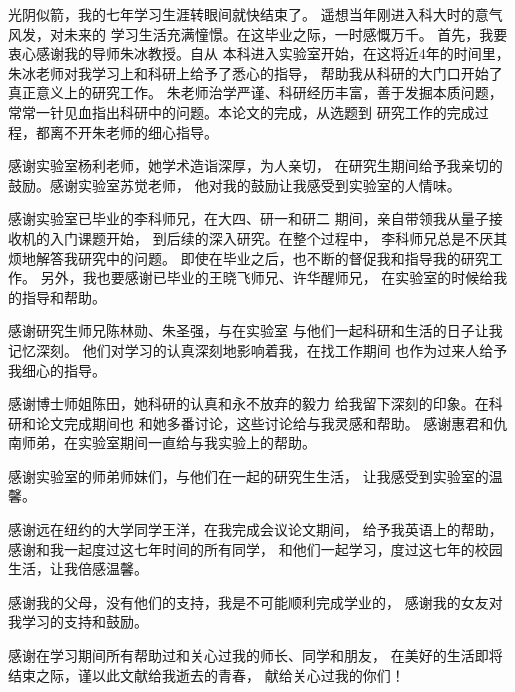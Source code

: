 \begin{acknowledgements}
光阴似箭，我的七年学习生涯转眼间就快结束了。
遥想当年刚进入科大时的意气风发，对未来的
学习生活充满憧憬。在这毕业之际，一时感慨万千。
首先，我要衷心感谢我的导师朱冰教授。自从
本科进入实验室开始，在这将近4年的时间里，
朱冰老师对我学习上和科研上给予了悉心的指导，
帮助我从科研的大门口开始了真正意义上的研究工作。
朱老师治学严谨、科研经历丰富，善于发掘本质问题，
常常一针见血指出科研中的问题。本论文的完成，从选题到
研究工作的完成过程，都离不开朱老师的细心指导。

感谢实验室杨利老师，她学术造诣深厚，为人亲切，
在研究生期间给予我亲切的鼓励。感谢实验室苏觉老师，
他对我的鼓励让我感受到实验室的人情味。

感谢实验室已毕业的李科师兄，在大四、研一和研二
期间，亲自带领我从量子接收机的入门课题开始，
到后续的深入研究。在整个过程中，
李科师兄总是不厌其烦地解答我研究中的问题。
即使在毕业之后，也不断的督促我和指导我的研究工作。
另外，我也要感谢已毕业的王晓飞师兄、许华醒师兄，
在实验室的时候给我的指导和帮助。

感谢研究生师兄陈林勋、朱圣强，与在实验室
与他们一起科研和生活的日子让我记忆深刻。
他们对学习的认真深刻地影响着我，在找工作期间
也作为过来人给予我细心的指导。

感谢博士师姐陈田，她科研的认真和永不放弃的毅力
给我留下深刻的印象。在科研和论文完成期间也
和她多番讨论，这些讨论给与我灵感和帮助。
感谢惠君和仇南师弟，在实验室期间一直给与我实验上的帮助。

感谢实验室的师弟师妹们，与他们在一起的研究生生活，
让我感受到实验室的温馨。

感谢远在纽约的大学同学王洋，在我完成会议论文期间，
给予我英语上的帮助，感谢和我一起度过这七年时间的所有同学，
和他们一起学习，度过这七年的校园生活，让我倍感温馨。

感谢我的父母，没有他们的支持，我是不可能顺利完成学业的，
感谢我的女友对我学习的支持和鼓励。

感谢在学习期间所有帮助过和关心过我的师长、同学和朋友，
在美好的生活即将结束之际，谨以此文献给我逝去的青春，
献给关心过我的你们！

\end{acknowledgements}
